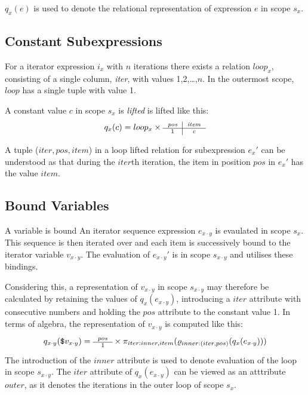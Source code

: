 $q_{x}(e)$ is used to denote the relational representation of expression $e$ in scope $s_{x}$.


\subsection{Constant Subexpressions}
\label{sect:trans:ll:ConstExprs}

For a iterator expression $i_{x}$ with $n$ iterations there exists a relation $loop_{x}$, consisting of a
single column, \textit{iter}, with values 1,2,\ldots,$n$. In the outermost scope, $loop$ has a single tuple with
value 1.

A constant value $c$ in scope $s_{x}$ is \textit{lifted} is lifted like this:
\begin{equation}
q_{x}(c) =  loop_{x} \times \mbox{\scriptsize \begin{tabular}{c|c} \textit{pos}&\textit{item} \\
\hline 1 & \textit{c}
\end{tabular}}
\label{eq:ll:constLoopLift}
\end{equation}

A tuple ($iter,pos,item$) in a loop lifted relation for subexpression $e_{x}'$ can be understood as that during the
$iter$th iteration, the item in position $pos$ in $e_{x}'$ has the value $item$.

\subsection{Bound Variables}
\label{sect:trans:ll:boundVar}

A variable is bound
An iterator sequence expression $e_{x \cdot y}$ is evaulated in scope $s_{x}$. This sequence is then iterated over
and each item is successively bound to the iterator variable $v_{x \cdot y}$. The evaluation of $e_{x \cdot y}'$
is in scope $s_{x \cdot y}$ and utilises these bindings. 

Considering this, a representation of $v_{x \cdot y}$ in scope $s_{x \cdot y}$ may therefore be calculated by
retaining the values of $q_{x}(e_{x \cdot y})$, introducing a $iter$ attribute with consecutive numbers and
holding the $pos$ attribute to the constant value 1. In terms of algebra, the representation of $v_{x \cdot y}$ is
computed like this:
\begin{equation}
q_{x \cdot y}(\mbox{\texttt{\$}}v_{x \cdot y}) = \mbox{\scriptsize \begin{tabular}{c} $pos$ \\\hline 1
\end{tabular}} \times \pi_{iter:inner,item}(\varrho_{inner:(iter,pos)}(q_{x}(e_{x \cdot y})))
\label{eq:ll:qxy_vxy}
\end{equation}
The introduction of the $inner$ attribute is used to denote evaluation of the loop in scope $s_{x \cdot y}$. The
$iter$ attribute of $q_{x}(e_{x \cdot y})$ can be viewed as an atttribute $outer$, as it denotes the iterations in
the outer loop of scope $s_{x}$.

